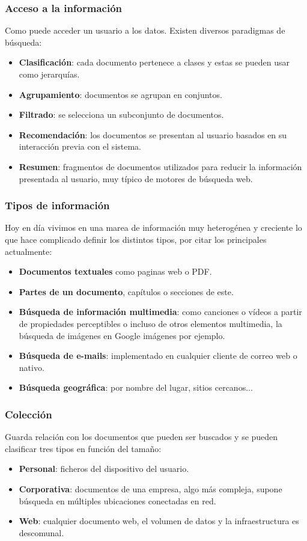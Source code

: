 \subsubsection{Acceso a la información}
Como puede acceder un usuario a los datos. Existen diversos paradigmas de búsqueda:
\begin{itemize}
	\item \textbf{Clasificación}: cada documento pertenece a clases y estas se pueden usar como jerarquías.
	\item \textbf{Agrupamiento}: documentos se agrupan en conjuntos.
	\item \textbf{Filtrado}: se selecciona un subconjunto de documentos.
	\item \textbf{Recomendación}: los documentos se presentan al usuario basados en su interacción previa con el sistema.
	\item \textbf{Resumen}: fragmentos de documentos utilizados para reducir la información presentada al usuario, muy típico de motores de búsqueda web.
\end{itemize}
\subsubsection{Tipos de información}
Hoy en día vivimos en una marea de información muy heterogénea y creciente lo que hace complicado definir los distintos tipos, por citar los principales actualmente:
\begin{itemize}
	\item \textbf{Documentos textuales} como paginas web o \acrshort{PDF}.
	\item \textbf{Partes de un documento}, capítulos o secciones de este.
	\item \textbf{Búsqueda de información multimedia}: como canciones o vídeos a partir de propiedades perceptibles o incluso de otros elementos multimedia, la búsqueda de imágenes en Google imágenes por ejemplo.
	\item \textbf{Búsqueda de e-mails}: implementado en cualquier cliente de correo web o nativo.
	\item \textbf{Búsqueda geográfica}: por nombre del lugar, sitios cercanos...
\end{itemize}
\subsubsection{Colección}
Guarda relación con los documentos que pueden ser buscados y se pueden clasificar tres tipos en función del tamaño:
\begin{itemize}
	\item \textbf{Personal}: ficheros del dispositivo del usuario.
	\item \textbf{Corporativa}: documentos de una empresa, algo más compleja, supone búsqueda en múltiples ubicaciones conectadas en red.
	\item \textbf{Web}: cualquier documento web, el volumen de datos y la infraestructura es descomunal.
\end{itemize}


